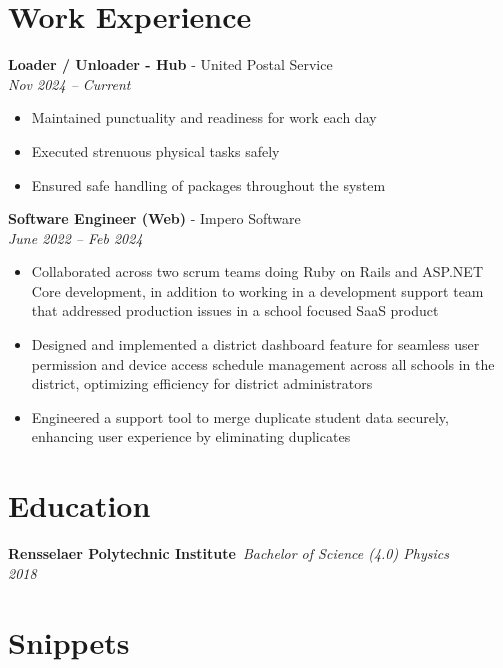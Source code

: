 \documentclass[a4paper,10pt]{article}
\begin{document}
\begin{flushleft}

\section*{Work Experience}
\textbf{Loader / Unloader - Hub} - United Postal Service\\
\textit{Nov 2024 – Current}
\begin{itemize}
    \item Maintained punctuality and readiness for work each day
    \item Executed strenuous physical tasks safely
    \item Ensured safe handling of packages throughout the system
\end{itemize}

\textbf{Software Engineer (Web)} - Impero Software\\
\textit{June 2022 – Feb 2024}
\begin{itemize}
    \item Collaborated across two scrum teams doing Ruby on Rails and ASP.NET Core development, in
 addition to working in a development support team that addressed production issues in a school
focused SaaS product
    \item Designed and implemented a district dashboard feature for seamless user permission and device access schedule management across all schools in the district, optimizing efficiency for district administrators
    \item Engineered a support tool to merge duplicate student data securely, enhancing user experience by eliminating duplicates
    
\end{itemize}

\section*{Education}
\textbf{Rensselaer Polytechnic Institute}\
\textit{Bachelor of Science (4.0) Physics}\\
\textit{2018}

\section*{Snippets}


\end{flushleft}
\end{document}
